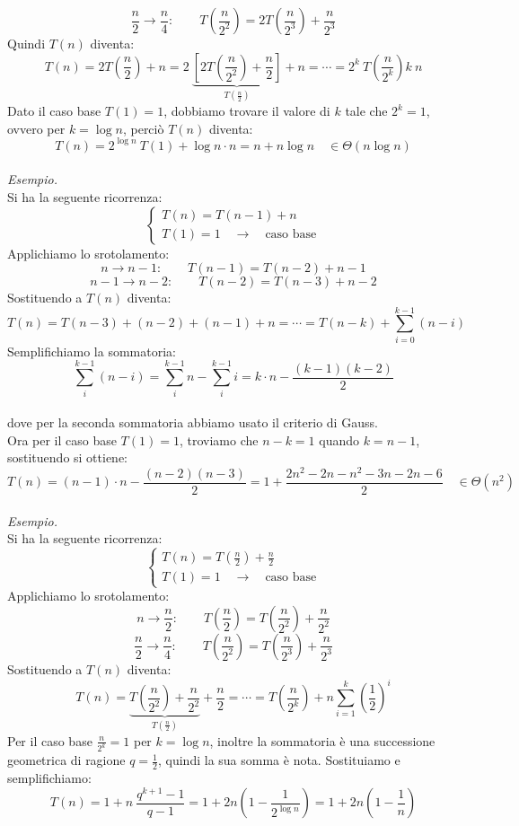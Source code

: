 $$\frac{n}{2}\to \frac{n}{4}:\qquad T\left(\frac{n}{2^2}\right)=2T\left(\frac{n}{2^3}\right)+\frac{n}{2^3}$$
Quindi $T(n)$ diventa:
$$T(n)= 2T\left( \frac{n}{2} \right) +n = 2\ \underbrace{\left[ 2T\left( \frac{n}{2^2} \right) +\frac{n}{2} \right]}_{\displaystyle T\left( \frac{n}{2} \right)  } + n  = \cdots = \boxed{2^k\  T \left( \frac{n}{2^k} \right)k\ n }$$
Dato il caso base $T(1) = 1$, dobbiamo trovare il valore di $k$ tale che $2^k = 1$, ovvero per $k = \log n$, perciò $T(n)$ diventa:
$$\displaystyle  T(n) = 2^{\displaystyle \log n} \ T(1)+\log n \cdot n = n + n \log n \quad \in \Theta(n \log n )$$
\bigskip\\
\textit{Esempio.}\\
Si ha la seguente ricorrenza:
$$\begin{cases}
    T(n) = T(n-1) +n\\
    T(1) = 1 \quad \to \quad \text{caso base}
\end{cases}$$
Applichiamo lo srotolamento:
$$n\to n-1:\qquad T(n-1) = T(n-2)+n-1$$
$$n-1 \to n-2: \qquad T(n-2) = T(n-3)+n-2$$
Sostituendo a $T(n)$ diventa:
$$T(n) = T(n-3) +(n-2) + (n-1) + n = \cdots =  \boxed{T(n-k)+\sum_{i=0}^{k-1}{(n-i)}}$$
Semplifichiamo la sommatoria:
$$\sum_{i}^{k-1}{(n-i)}=\sum_{i}^{k-1}{n}-\sum_{i}^{k-1}{i}=k \cdot n-\frac{(k-1)(k-2)}{2}$$\\
dove per la seconda sommatoria abbiamo usato il criterio di Gauss.\\
Ora per il caso base $T(1) =1$, troviamo che $n-k = 1$ quando $k = n-1$, sostituendo si ottiene:
$$T(n)=(n-1) \cdot n - \frac{(n-2)(n-3)}{2} = 1+\frac{2n^2-2n-n^2-3n-2n-6}{2} \quad \in \Theta(n^2)$$
\bigskip\\
\textit{Esempio.}\\
Si ha la seguente ricorrenza:
 $$
\begin{cases}
\displaystyle T(n)=T\left(\frac{n}{2}\right)+\frac{n}{2}\\
T(1)=1\quad \to \quad \text{caso base} 
\end{cases}$$
Applichiamo lo srotolamento:
$$n\to \frac{n}{2}:\qquad T\left(\frac{n}{2}\right)=T\left(\frac{n}{2^2}\right)+\frac{n}{2^2}$$
$$\frac{n}{2}\to \frac{n}{4}:\qquad T\left(\frac{n}{2^2}\right)=T\left(\frac{n}{2^3}\right)+\frac{n}{2^3}$$
Sostituendo a $T(n)$ diventa:
$$T(n)=\underbrace{T\left(\frac{n}{2^2}\right)+\frac{n}{2^2}}_{\displaystyle  T\left(\frac{n}{2}\right)}+\frac{n}{2} = \cdots=\boxed{T\left(\frac{n}{2^k}\right)+n\sum_{i=1}^{k}\left({\frac{1}{2}}\right)^i}$$
Per il caso base $\frac{n}{2^k} = 1$ per $k = \log n$, inoltre la sommatoria è una successione geometrica di ragione $q = \frac{1}{2}$, quindi la sua somma è nota. Sostituiamo e semplifichiamo:
$$T(n)=1+n\  \frac{q^{k+1}-1}{q-1}=1+2n\left(1-\frac{1}{2^{\displaystyle 
\log n}}\right) = 1+2n\left(1-\frac{1}{n}\right)$$
